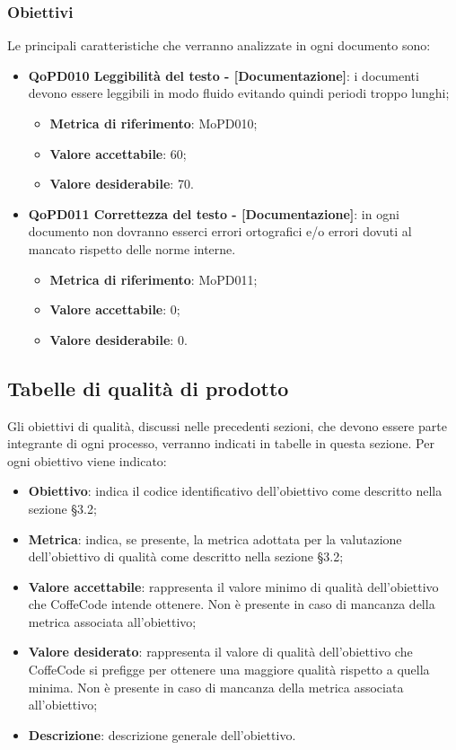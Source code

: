\documentclass[../piano-di-qualifica.tex]{subfiles}
\begin{document}
\subsubsection{Obiettivi}
\label{sub:obiettivi}
Le principali caratteristiche che verranno analizzate in ogni documento sono:
\begin{itemize}
    \item \textbf{QoPD010 Leggibilità del testo - [Documentazione]}: i documenti devono essere leggibili in modo fluido evitando quindi periodi troppo lunghi;
        \begin{itemize}
            \item \textbf{Metrica di riferimento}: MoPD010;
            \item \textbf{Valore accettabile}: 60;
            \item \textbf{Valore desiderabile}: 70.
        \end{itemize}
    \item \textbf{QoPD011 Correttezza del testo - [Documentazione]}: in ogni documento non dovranno esserci errori ortografici e/o errori dovuti al mancato rispetto delle norme interne.
        \begin{itemize}
            \item \textbf{Metrica di riferimento}: MoPD011;
            \item \textbf{Valore accettabile}: 0;
            \item \textbf{Valore desiderabile}: 0.
        \end{itemize}
\end{itemize}

\subsection{Tabelle di qualità di prodotto}
\label{sub:tabelle_di_qualita_di_prodotto}
Gli obiettivi di qualità, discussi nelle precedenti sezioni, che devono essere parte integrante di ogni processo, verranno indicati in tabelle in questa sezione.
Per ogni obiettivo viene indicato:

\begin{itemize}
   \item \textbf{Obiettivo}: indica il codice identificativo dell'obiettivo come descritto nella sezione §3.2;
   \item \textbf{Metrica}: indica, se presente, la metrica adottata per la valutazione dell'obiettivo di qualità come descritto nella sezione §3.2;
   \item \textbf{Valore accettabile}: rappresenta il valore minimo di qualità dell'obiettivo che CoffeCode intende ottenere. Non è presente in caso di mancanza della metrica associata all'obiettivo;
   \item \textbf{Valore desiderato}: rappresenta il valore di qualità dell'obiettivo che CoffeCode si prefigge per ottenere una maggiore qualità rispetto a quella minima. Non è presente in caso di mancanza della metrica associata all'obiettivo;
   \item \textbf{Descrizione}: descrizione generale dell'obiettivo.
\end{itemize}
\end{document}
